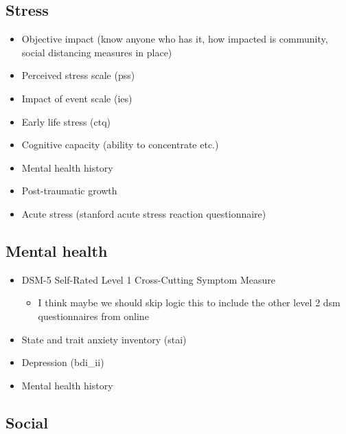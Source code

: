 \documentclass[]{book}
\providecommand{\tightlist}{%
  \setlength{\itemsep}{0pt}\setlength{\parskip}{0pt}}
\begin{document}
\hypertarget{stress}{%
\subsection{Stress}\label{stress}}

\begin{itemize}
\tightlist
\item
  Objective impact (know anyone who has it, how impacted is community, social distancing measures in place)
\item
  Perceived stress scale (pss)
\item
  Impact of event scale (ies)
\item
  Early life stress (ctq)
\item
  Cognitive capacity (ability to concentrate etc.)
\item
  Mental health history
\item
  Post-traumatic growth
\item
  Acute stress (stanford acute stress reaction questionnaire)
\end{itemize}

\hypertarget{mental-health}{%
\subsection{Mental health}\label{mental-health}}

\begin{itemize}
\tightlist
\item
  DSM-5 Self-Rated Level 1 Cross-Cutting Symptom Measure

  \begin{itemize}
  \tightlist
  \item
    I think maybe we should skip logic this to include the other level 2 dsm questionnaires from online
  \end{itemize}
\item
  State and trait anxiety inventory (stai)
\item
  Depression (bdi\_ii)
\item
  Mental health history
\end{itemize}

\hypertarget{social}{%
\subsection{Social}\label{social}}
\end{document}
